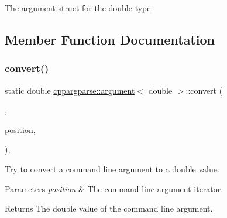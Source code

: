 The argument struct for the double type. 

\subsection{Member Function Documentation}
\mbox{\label{structcppargparse_1_1argument_3_01double_01_4_a19756d869b671553629d509f18549903}} 
\subsubsection{\texorpdfstring{convert()}{convert()}}
{\footnotesize\ttfamily static double \hyperlink{structcppargparse_1_1argument}{cppargparse\+::argument}$<$ double $>$\+::convert (\begin{DoxyParamCaption}\item[{const types\+::\+Command\+Line\+\_\+t \&}]{,  }\item[{const types\+::\+Command\+Line\+Position\+\_\+t \&}]{position,  }\item[{const types\+::\+Command\+Line\+Arguments\+\_\+t \&}]{ }\end{DoxyParamCaption})\hspace{0.3cm}{\ttfamily [inline]}, {\ttfamily [static]}}



Try to convert a command line argument to a double value. 


\begin{DoxyParams}{Parameters}
{\em position} & The command line argument iterator.\\
\hline
\end{DoxyParams}
\begin{DoxyReturn}{Returns}
The double value of the command line argument. 
\end{DoxyReturn}
\mbox{\label{structcppargparse_1_1argument_3_01double_01_4_aa587b4a64888fd195328d2491f893bc5}} 
